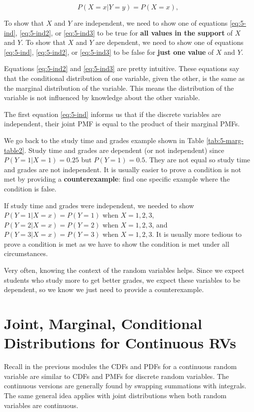 \documentclass[
]{book}
\begin{document}
\begin{equation} 
P(X=x | Y=y) = P(X=x),
\label{eq:5-ind3}
\end{equation}

To show that \(X\) and \(Y\) are independent, we need to show one of equations \eqref{eq:5-ind}, \eqref{eq:5-ind2}, or \eqref{eq:5-ind3} to be true for \textbf{all values in the support} of \(X\) and \(Y\). To show that \(X\) and \(Y\) are dependent, we need to show one of equations \eqref{eq:5-ind}, \eqref{eq:5-ind2}, or \eqref{eq:5-ind3} to be false for \textbf{just one value} of \(X\) and \(Y\).

Equations \eqref{eq:5-ind2} and \eqref{eq:5-ind3} are pretty intuitive. These equations say that the conditional distribution of one variable, given the other, is the same as the marginal distribution of the variable. This means the distribution of the variable is not influenced by knowledge about the other variable.

The first equation \eqref{eq:5-ind} informs us that if the discrete variables are independent, their joint PMF is equal to the product of their marginal PMFs.

We go back to the study time and grades example shown in Table \ref{tab:5-marg-table2}. Study time and grades are dependent (or not independent) since \(P(Y=1|X=1) = 0.25\) but \(P(Y=1) = 0.5\). They are not equal so study time and grades are not independent. It is usually easier to prove a condition is not met by providing a \textbf{counterexample}: find one specific example where the condition is false.

If study time and grades were independent, we needed to show \(P(Y=1|X=x) = P(Y=1)\) when \(X=1,2,3\), \(P(Y=2|X=x) = P(Y=2)\) when \(X=1,2,3\), and \(P(Y=3|X=x) = P(Y=3)\) when \(X=1,2,3\). It is usually more tedious to prove a condition is met as we have to show the condition is met under all circumstances.

Very often, knowing the context of the random variables helps. Since we expect students who study more to get better grades, we expect these variables to be dependent, so we know we just need to provide a counterexample.

\hypertarget{jointCont}{%
\section{Joint, Marginal, Conditional Distributions for Continuous RVs}\label{jointCont}}

Recall in the previous modules the CDFs and PDFs for a continuous random variable are similar to CDFs and PMFs for discrete random variables. The continuous versions are generally found by swapping summations with integrals. The same general idea applies with joint distributions when both random variables are continuous.
\end{document}
